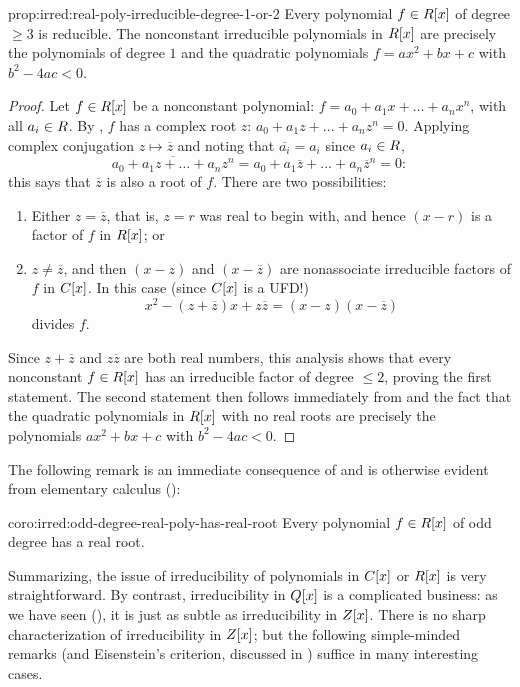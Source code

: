 \begin{prop}{}{prop:irred:real-poly-irreducible-degree-1-or-2}
  Every polynomial $f \in R[x]$ of degree $\geq 3$ is reducible.  The
  nonconstant irreducible polynomials in $R[x]$ are precisely the
  polynomials of degree $1$ and the quadratic polynomials
  $f = ax^2 + bx + c$ with $b^2 - 4ac < 0$.
\end{prop}
\begin{proof}
  Let $f \in R[x]$ be a nonconstant polynomial:
  $f = a_0 + a_1 x + \dots + a_n x^n$, with all $a_i \in R$.  By
  , $f$ has a complex root $z$:
  $a_0 + a_1 z + \dots + a_n z^n = 0$. Applying complex conjugation
  $z \mapsto \overline{z}$ and noting that $\overline{a_i} = a_i$
  since $a_i \in R$,
  \[
    \overline{a_0 + a_1 z + \dots + a_n z^n} = a_0 + a_1 \overline{z}
    + \dots + a_n \overline{z}^n = 0:
  \]
  this says that $\overline{z}$ is also a root of $f$. There are two
  possibilities:
  \begin{enumerate}[label=(\arabic*)]
  \item Either $z = \overline{z}$, that is, $z = r$ was real to begin
    with, and hence $(x - r)$ is a factor of $f$ in $R[x]$; or
  \item $z \neq \overline{z}$, and then $(x - z)$ and
    $(x - \overline{z})$ are nonassociate irreducible factors of $f$
    in $C[x]$. In this case (since $C[x]$ is a UFD!)
    \[
      x^2 - (z + \overline{z})x + z\overline{z} = (x - z)(x -
      \overline{z})
    \]
    divides $f$.
  \end{enumerate}
  Since $z + \overline{z}$ and $z\overline{z}$ are both real numbers,
  this analysis shows that every nonconstant $f \in R[x]$ has an
  irreducible factor of degree $\leq 2$, proving the first
  statement. The second statement then follows immediately from
   and the fact that the quadratic polynomials in
  $R[x]$ with no real roots are precisely the polynomials
  $ax^2 + bx + c$ with $b^2 - 4ac < 0$.
\end{proof}
The following remark is an immediate consequence of
 and is otherwise evident from elementary
calculus ():

\begin{coro}{}{coro:irred:odd-degree-real-poly-has-real-root}
  Every polynomial $f \in R[x]$ of odd degree has a real root.
\end{coro}
Summarizing, the issue of irreducibility of polynomials in $C[x]$ or
$R[x]$ is very straightforward. By contrast, irreducibility in
$Q[x]$ is a complicated business: as we have seen
(), it is just as subtle as irreducibility in
$Z[x]$. There is no sharp characterization of irreducibility in
$Z[x]$; but the following simple-minded remarks (and Eisenstein's
criterion, discussed in )
suffice in many interesting cases.

